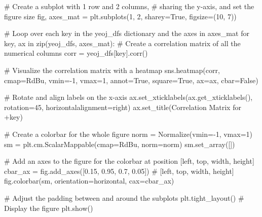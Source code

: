 \documentclass[
  letterpaper,
  DIV=11,
  numbers=noendperiod,
  oneside]{scrartcl}
\newenvironment{Shaded}{\begin{snugshade}}{\end{snugshade}}
\newcommand{\BuiltInTok}[1]{\textcolor[rgb]{0.00,0.23,0.31}{#1}}
\newcommand{\CommentTok}[1]{\textcolor[rgb]{0.37,0.37,0.37}{#1}}
\newcommand{\ControlFlowTok}[1]{\textcolor[rgb]{0.00,0.23,0.31}{#1}}
\newcommand{\DecValTok}[1]{\textcolor[rgb]{0.68,0.00,0.00}{#1}}
\newcommand{\FloatTok}[1]{\textcolor[rgb]{0.68,0.00,0.00}{#1}}
\newcommand{\KeywordTok}[1]{\textcolor[rgb]{0.00,0.23,0.31}{#1}}
\newcommand{\NormalTok}[1]{\textcolor[rgb]{0.00,0.23,0.31}{#1}}
\newcommand{\OperatorTok}[1]{\textcolor[rgb]{0.37,0.37,0.37}{#1}}
\newcommand{\StringTok}[1]{\textcolor[rgb]{0.13,0.47,0.30}{#1}}
\newcommand{\VariableTok}[1]{\textcolor[rgb]{0.07,0.07,0.07}{#1}}
\begin{document}
\hfill\break

\begin{Shaded}
\begin{Highlighting}[]
\CommentTok{\# Create a subplot with 1 row and 2 columns, }
\CommentTok{\# sharing the y{-}axis, and set the figure size}
\NormalTok{fig, axes\_mat }\OperatorTok{=}\NormalTok{ plt.subplots(}\DecValTok{1}\NormalTok{, }\DecValTok{2}\NormalTok{, sharey}\OperatorTok{=}\VariableTok{True}\NormalTok{, figsize}\OperatorTok{=}\NormalTok{(}\DecValTok{10}\NormalTok{, }\DecValTok{7}\NormalTok{))}

\CommentTok{\# Loop over each key in the \textquotesingle{}yeoj\_dfs\textquotesingle{} dictionary and the axes in \textquotesingle{}axes\_mat\textquotesingle{}}
\ControlFlowTok{for}\NormalTok{ key, ax }\KeywordTok{in} \BuiltInTok{zip}\NormalTok{(yeoj\_dfs, axes\_mat):}
    \CommentTok{\# Create a correlation matrix of all the numerical columns}
\NormalTok{    corr }\OperatorTok{=}\NormalTok{ yeoj\_dfs[key].corr()}

    \CommentTok{\# Visualize the correlation matrix with a heatmap}
\NormalTok{    sns.heatmap(corr, cmap}\OperatorTok{=}\StringTok{\textquotesingle{}RdBu\textquotesingle{}}\NormalTok{, vmin}\OperatorTok{={-}}\DecValTok{1}\NormalTok{, vmax}\OperatorTok{=}\DecValTok{1}\NormalTok{, annot}\OperatorTok{=}\VariableTok{True}\NormalTok{, square}\OperatorTok{=}\VariableTok{True}\NormalTok{, ax}\OperatorTok{=}\NormalTok{ax, cbar}\OperatorTok{=}\VariableTok{False}\NormalTok{)}

    \CommentTok{\# Rotate and align labels on the x{-}axis}
\NormalTok{    ax.set\_xticklabels(ax.get\_xticklabels(), rotation}\OperatorTok{=}\DecValTok{45}\NormalTok{, horizontalalignment}\OperatorTok{=}\StringTok{\textquotesingle{}right\textquotesingle{}}\NormalTok{)}
\NormalTok{    ax.set\_title(}\StringTok{\textquotesingle{}Correlation Matrix for \textquotesingle{}}\OperatorTok{+}\NormalTok{key)}

\CommentTok{\# Create a colorbar for the whole figure}
\NormalTok{norm }\OperatorTok{=}\NormalTok{ Normalize(vmin}\OperatorTok{={-}}\DecValTok{1}\NormalTok{, vmax}\OperatorTok{=}\DecValTok{1}\NormalTok{)}
\NormalTok{sm }\OperatorTok{=}\NormalTok{ plt.cm.ScalarMappable(cmap}\OperatorTok{=}\StringTok{\textquotesingle{}RdBu\textquotesingle{}}\NormalTok{, norm}\OperatorTok{=}\NormalTok{norm)}
\NormalTok{sm.set\_array([])}

\CommentTok{\# Add an axes to the figure for the colorbar at position [left, top, width, height]}
\NormalTok{cbar\_ax }\OperatorTok{=}\NormalTok{ fig.add\_axes([}\FloatTok{0.15}\NormalTok{, }\FloatTok{0.95}\NormalTok{, }\FloatTok{0.7}\NormalTok{, }\FloatTok{0.05}\NormalTok{])  }\CommentTok{\# [left, top, width, height]}
\NormalTok{fig.colorbar(sm, orientation}\OperatorTok{=}\StringTok{\textquotesingle{}horizontal\textquotesingle{}}\NormalTok{, cax}\OperatorTok{=}\NormalTok{cbar\_ax)}

\CommentTok{\# Adjust the padding between and around the subplots}
\NormalTok{plt.tight\_layout()}
\CommentTok{\# Display the figure}
\NormalTok{plt.show()}
\end{Highlighting}
\end{Shaded}
\end{document}
